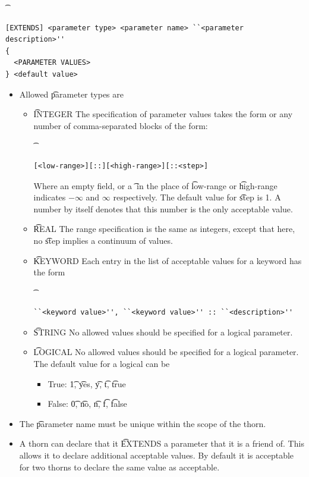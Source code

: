 {\t
\begin{verbatim}
[EXTENDS] <parameter type> <parameter name> ``<parameter description>'' 
{
  <PARAMETER VALUES>
} <default value>
\end{verbatim}
}
\begin{itemize}
\item{} Allowed {\t parameter types} are 
  \begin{itemize}
     \item{} {\t INTEGER} The specification of parameter values takes 
     the form or any number of comma-separated blocks of the form:
{\t
\begin{verbatim}
[<low-range>][::][<high-range>][::<step>]
\end{verbatim}
}
Where an empty field, or a {\t *} in the place of {\t low-range} or
{\t high-range} indicates $-\infty$ and $\infty$ respectively. The 
default value for {\t step} is 1. A number by itself denotes that
this number is the only acceptable value.
     \item{} {\t REAL} The range specification is the same as integers,
             except that here, no {\t step} implies a continuum of values.
     \item{} {\t KEYWORD} Each entry in the list of acceptable values 
             for a keyword has the form 
{\t
\begin{verbatim}
``<keyword value>'', ``<keyword value>'' :: ``<description>''
\end{verbatim}
}
     \item{} {\t STRING}  No allowed values should be specified for a logical 
             parameter.
     \item{} {\t LOGICAL} No allowed values should be specified for a logical 
             parameter. The default value for a logical can be 
        \begin{itemize}
           \item{} True: {\t 1}, {\t yes}, {\t y}, {\t t}, {\t true}
           \item{} False: {\t 0}, {\t no}, {\t n}, {\t f}, {\t false}
        \end{itemize}
  \end{itemize}

\item{} The {\t parameter name} must be unique within the scope of the thorn.

\item{} A thorn can declare that it {\t EXTENDS} a parameter that it is a 
        friend of. This allows it to declare additional acceptable values.
        By default it is acceptable for two thorns to declare the same 
        value as acceptable. 
\end{itemize}


